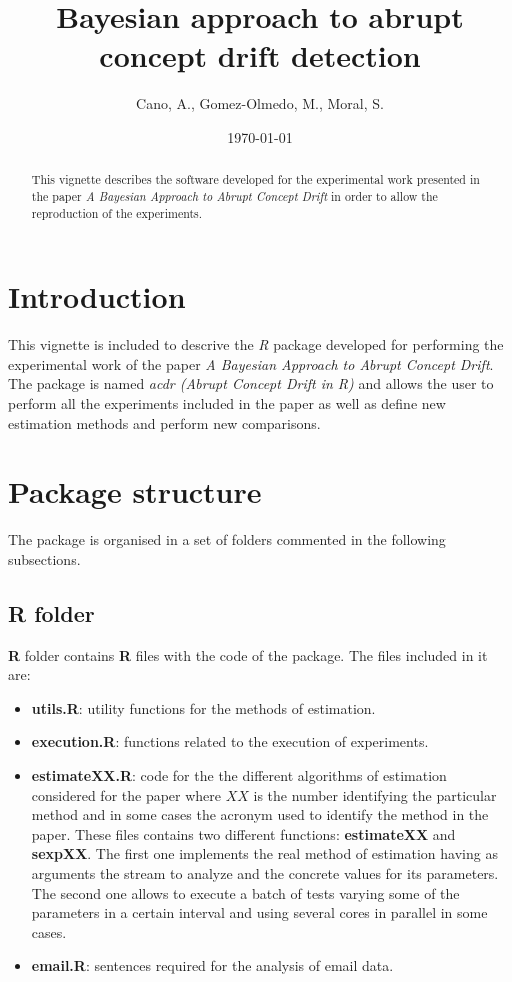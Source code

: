 \documentclass{article}
\title{Bayesian approach to abrupt concept drift detection}
\author{Cano, A., Gomez-Olmedo, M., Moral, S.
  \\\email{\{acu, mgomez, smc\}@decsai.ugr.es}}
\date{\today}
\begin{document}

\maketitle



\begin{abstract}
This vignette describes the software developed for the experimental work
presented in the paper \textit{A Bayesian Approach to Abrupt Concept Drift}
in order to allow the reproduction of the experiments.
\end{abstract}


\section{Introduction}

This vignette is included to descrive the \textit{R} package developed for
performing the experimental work of the paper \textit{A Bayesian Approach to
Abrupt Concept Drift}. The package is named \textit{acdr (Abrupt Concept Drift
in R)} and allows the user to perform all the experiments included in the
paper as well as define new estimation methods and perform new comparisons.

\section{Package structure}

The package is organised in a set of folders commented in the following subsections.

\subsection{R folder}
\textbf{R} folder contains \textbf{R} files with the code of the package. The files
included in it are:

\begin{itemize}
\item \textbf{utils.R}: utility functions for the methods of estimation.

\item \textbf{execution.R}: functions related to the execution of experiments.

\item \textbf{estimateXX.R}: code for the the different algorithms of estimation
considered for the paper where $XX$ is the number identifying the particular
method and in some cases the acronym used to identify the method in the paper.
These files contains two different functions: \textbf{estimateXX} and
\textbf{sexpXX}. The first one implements the real method of estimation having
as arguments the stream to analyze and the concrete values for its parameters.
The second one allows to execute a batch of tests varying some of the parameters
in a certain interval and using several cores in parallel in some cases.

\item \textbf{email.R}: sentences required for the analysis of email data.
\end{itemize}
\end{document}

